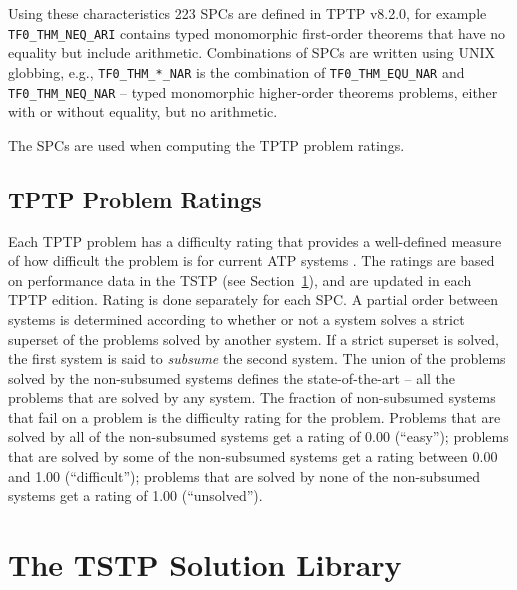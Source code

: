 \documentclass[runningheads]{llncs}
\begin{document}
Using these characteristics 223 SPCs are defined in TPTP v8.2.0, for example
{\tt TF0\_THM\_NEQ\_ARI} contains typed monomorphic first-order theorems that have no equality but 
include arithmetic.
Combinations of SPCs are written using UNIX globbing, e.g., {\tt TF0\_THM\_*\_NAR} is the
combination of {\tt TF0\_THM\_EQU\_NAR} and {\tt TF0\_THM\_NEQ\_NAR} -- typed monomorphic 
higher-order theorems problems, either with or without equality, but no arithmetic.

The SPCs are used when computing the TPTP problem ratings.

\subsection{TPTP Problem Ratings}
\label{Ratings}

Each TPTP problem has a difficulty rating that provides a well-defined measure of how difficult 
the problem is for current ATP systems \cite{SS01}.
The ratings are based on performance data in the TSTP (see Section~\ref{TSTP}), and are updated
in each TPTP edition.
Rating is done separately for each SPC.
A partial order between systems is determined according to whether or not a system solves a strict 
superset of the problems solved by another system. 
If a strict superset is solved, the first system is said to {\em subsume} the second system. 
The union of the problems solved by the non-subsumed systems defines the state-of-the-art -- all 
the problems that are solved by any system. 
The fraction of non-subsumed systems that fail on a problem is the difficulty rating for the 
problem. 
Problems that are solved by all of the non-subsumed systems get a rating of 0.00 (``easy'');
problems that are solved by some of the non-subsumed systems get a rating between 
0.00 and 1.00 (``difficult''); 
problems that are solved by none of the non-subsumed systems get a rating of 1.00 (``unsolved'').

\section{The TSTP Solution Library}
\label{TSTP}
\end{document}
